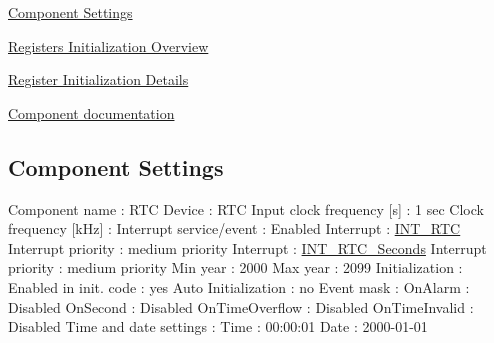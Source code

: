 \begin{DoxyItemize}
\item \hyperlink{RTC_settings}{Component Settings}
\item \hyperlink{RTC_regs_overview}{Registers Initialization Overview}
\item \hyperlink{RTC_regs_details}{Register Initialization Details}
\item \hyperlink{group___r_t_c__module}{Component documentation} 
\end{DoxyItemize}\hypertarget{RTC_settings}{}\subsection{Component Settings}\label{RTC_settings}

\begin{DoxyCode}
            Component name                                 : RTC
            Device                                         : RTC
            Input clock frequency [s]                      : 1 sec
            Clock frequency [kHz]                          : 
            Interrupt service/event                        : Enabled
              Interrupt                                    : \hyperlink{group___interrupt__vector__numbers_gga5f3656e2a154b64aa378a2f3856c3a8daa4162d8752ffcf07bd0b1197f8c68f44}{INT\_RTC}
              Interrupt priority                           : medium priority
              Interrupt                                    : \hyperlink{group___interrupt__vector__numbers_gga5f3656e2a154b64aa378a2f3856c3a8da45c91289c03c8e8e65f1993cef955930}{INT\_RTC\_Seconds}
              Interrupt priority                           : medium priority
            Min year                                       : 2000
            Max year                                       : 2099
            Initialization                                 : 
              Enabled in init. code                        : yes
              Auto Initialization                          : no
              Event mask                                   : 
                OnAlarm                                    : Disabled
                OnSecond                                   : Disabled
                OnTimeOverflow                             : Disabled
                OnTimeInvalid                              : Disabled
              Time and date settings                       : 
                Time                                       : 00:00:01
                Date                                       : 2000-01-01

\end{DoxyCode}
